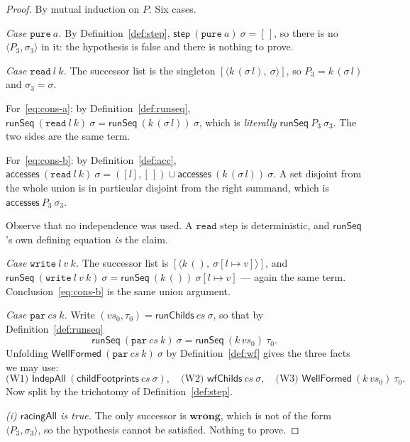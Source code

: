 \documentclass[11pt,a4paper]{article}
\theoremstyle{definition}
\theoremstyle{plain}
\theoremstyle{remark}
\newcommand{\st}{\sigma}
\newcommand{\acc}{\mathsf{accesses}}
\newcommand{\runSeq}{\mathsf{runSeq}}
\newcommand{\wf}{\mathsf{WellFormed}}
\newcommand{\wrong}{\mathbf{wrong}}
\newcommand{\upd}[3]{#1[#2 \mapsto #3]}
\begin{document}
\begin{proof}
By mutual induction on $P$. Six cases.

\medskip
\emph{Case $\texttt{pure}\ a$.} By Definition~\ref{def:step},
$\mathsf{step}\ (\texttt{pure}\ a)\ \st = [\,]$, so there is no
$\langle P_3, \st_3\rangle$ in it: the hypothesis is false and there is nothing to prove.

\medskip
\emph{Case $\texttt{read}\ l\ k$.} The successor list is the singleton
$[\langle k\,(\st\,l),\ \st\rangle]$, so $P_3 = k\,(\st\,l)$ and $\st_3 = \st$.

For~\eqref{eq:cons-a}: by Definition~\ref{def:runseq},
$\runSeq\ (\texttt{read}\ l\ k)\ \st = \runSeq\ (k\,(\st\,l))\ \st$, which is \emph{literally}
$\runSeq\ P_3\ \st_3$. The two sides are the same term.

For~\eqref{eq:cons-b}: by Definition~\ref{def:acc},
$\acc\ (\texttt{read}\ l\ k)\ \st = ([l],[\,]) \cup \acc\ (k\,(\st\,l))\ \st$. A set disjoint
from the whole union is in particular disjoint from the right summand, which is
$\acc\ P_3\ \st_3$.

Observe that no independence was used. A $\texttt{read}$ step is deterministic, and
$\runSeq$'s own defining equation \emph{is} the claim.

\medskip
\emph{Case $\texttt{write}\ l\ v\ k$.} The successor list is
$[\langle k\,(),\ \upd{\st}{l}{v}\rangle]$, and
$\runSeq\ (\texttt{write}\ l\ v\ k)\ \st = \runSeq\ (k\,())\ \upd{\st}{l}{v}$ --- again the
same term. Conclusion~\eqref{eq:cons-b} is the same union argument.

\medskip
\emph{Case $\texttt{par}\ cs\ k$.} Write $(vs_0, \tau_0) = \mathsf{runChilds}\ cs\ \st$, so
that by Definition~\ref{def:runseq}
\begin{equation}
  \runSeq\ (\texttt{par}\ cs\ k)\ \st = \runSeq\ (k\,vs_0)\ \tau_0 . \label{eq:star}
\end{equation}
Unfolding $\wf\ (\texttt{par}\ cs\ k)\ \st$ by Definition~\ref{def:wf} gives the three facts
we may use:
\[
  \text{(W1) } \mathsf{IndepAll}\ (\mathsf{childFootprints}\ cs\ \st), \quad
  \text{(W2) } \mathsf{wfChilds}\ cs\ \st, \quad
  \text{(W3) } \wf\ (k\,vs_0)\ \tau_0 .
\]
Now split by the trichotomy of Definition~\ref{def:step}.

\emph{(i) $\mathsf{racingAll}$ is true.} The only successor is $\wrong$, which is not of the
form $\langle P_3, \st_3\rangle$, so the hypothesis cannot be satisfied. Nothing to prove.


\end{proof}
\end{document}
